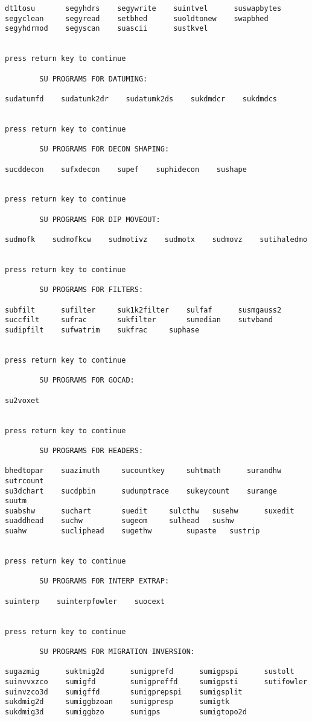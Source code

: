 {\begin{verbatim}
dt1tosu       segyhdrs    segywrite    suintvel      suswapbytes  
segyclean     segyread    setbhed      suoldtonew    swapbhed  
segyhdrmod    segyscan    suascii      sustkvel  


press return key to continue
 
        SU PROGRAMS FOR DATUMING:
 
sudatumfd    sudatumk2dr    sudatumk2ds    sukdmdcr    sukdmdcs  


press return key to continue
 
        SU PROGRAMS FOR DECON SHAPING:
 
sucddecon    sufxdecon    supef    suphidecon    sushape  


press return key to continue
 
        SU PROGRAMS FOR DIP MOVEOUT:
 
sudmofk    sudmofkcw  	sudmotivz    sudmotx  	sudmovz    sutihaledmo  


press return key to continue
 
        SU PROGRAMS FOR FILTERS:
 
subfilt      sufilter     suk1k2filter    sulfaf      susmgauss2  
succfilt     sufrac  	  sukfilter  	  sumedian    sutvband  
sudipfilt    sufwatrim    sukfrac  	  suphase  


press return key to continue
 
        SU PROGRAMS FOR GOCAD:
 
su2voxet  


press return key to continue
 
        SU PROGRAMS FOR HEADERS:
 
bhedtopar    suazimuth     sucountkey     suhtmath  	surandhw    sutrcount  
su3dchart    sucdpbin      sudumptrace    sukeycount  	surange     suutm  
suabshw      suchart  	   suedit  	  sulcthw  	susehw      suxedit  
suaddhead    suchw  	   sugeom  	  sulhead  	sushw  
suahw        sucliphead    sugethw  	  supaste  	sustrip  


press return key to continue
 
        SU PROGRAMS FOR INTERP EXTRAP:
 
suinterp    suinterpfowler    suocext  


press return key to continue
 
        SU PROGRAMS FOR MIGRATION INVERSION:
 
sugazmig      suktmig2d      sumigprefd      sumigpspi      sustolt  
suinvvxzco    sumigfd        sumigpreffd     sumigpsti      sutifowler  
suinvzco3d    sumigffd       sumigprepspi    sumigsplit  
sukdmig2d     sumiggbzoan    sumigpresp      sumigtk  
sukdmig3d     sumiggbzo      sumigps  	     sumigtopo2d  



\end{verbatim}}
